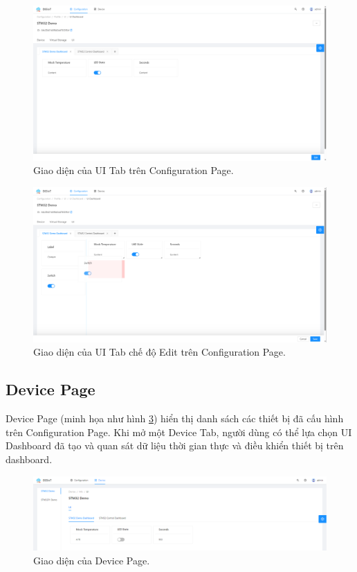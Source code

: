 \begin{figure}[htp]
\centering
\includegraphics[width=1.0\linewidth]{images/fig-config-ui-tab.png}
\caption{Giao diện của UI Tab trên Configuration Page.}
\label{fig:config-ui-tab}
\end{figure}

\begin{figure}[htp]
\centering
\includegraphics[width=1.0\linewidth]{images/fig-config-ui-tab-edit-mode.png}
\caption{Giao diện của UI Tab chế độ Edit trên Configuration Page.}
\label{fig:config-ui-tab-edit-mode}
\end{figure}

\subsection{Device Page}

Device Page (minh họa như hình \ref{fig:device-page}) hiển thị danh sách các thiết bị đã cấu hình trên Configuration Page. Khi mở một Device Tab, người dùng có thể lựa chọn UI Dashboard đã tạo và quan sát dữ liệu thời gian thực và điều khiển thiết bị trên dashboard.

\begin{figure}[htp]
\centering
\includegraphics[width=1.0\linewidth]{images/fig-device-page.png}
\caption{Giao diện của Device Page.}
\label{fig:device-page}
\end{figure}